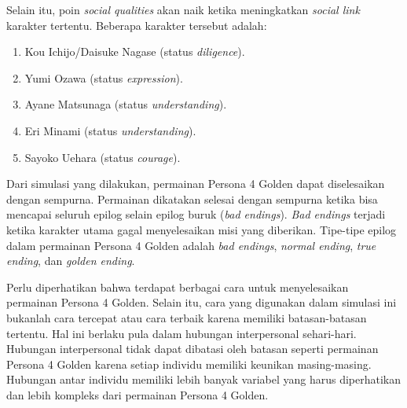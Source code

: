 Selain itu, poin \textit{social qualities} akan naik ketika meningkatkan \textit{social link} karakter tertentu. Beberapa karakter tersebut adalah:
\begin{enumerate}
    \item Kou Ichijo/Daisuke Nagase (status \textit{diligence}).
    \item Yumi Ozawa (status \textit{expression}).
    \item Ayane Matsunaga (status \textit{understanding}).
    \item Eri Minami (status \textit{understanding}).
    \item Sayoko Uehara (status \textit{courage}).
\end{enumerate}

Dari simulasi yang dilakukan, permainan Persona 4 Golden dapat diselesaikan dengan sempurna. Permainan dikatakan selesai dengan sempurna ketika bisa mencapai seluruh epilog selain epilog buruk (\textit{bad endings}). \textit{Bad endings} terjadi ketika karakter utama gagal menyelesaikan misi yang diberikan. Tipe-tipe epilog dalam permainan Persona 4 Golden adalah \textit{bad endings}, \textit{normal ending}, \textit{true ending}, dan \textit{golden ending}.

Perlu diperhatikan bahwa terdapat berbagai cara untuk menyelesaikan permainan Persona 4 Golden. Selain itu, cara yang digunakan dalam simulasi ini bukanlah cara tercepat atau cara terbaik karena memiliki batasan-batasan tertentu. Hal ini berlaku pula dalam hubungan interpersonal sehari-hari. Hubungan interpersonal tidak dapat dibatasi oleh batasan seperti permainan Persona 4 Golden karena setiap individu memiliki keunikan masing-masing. Hubungan antar individu memiliki lebih banyak variabel yang harus diperhatikan dan lebih kompleks dari permainan Persona 4 Golden.


